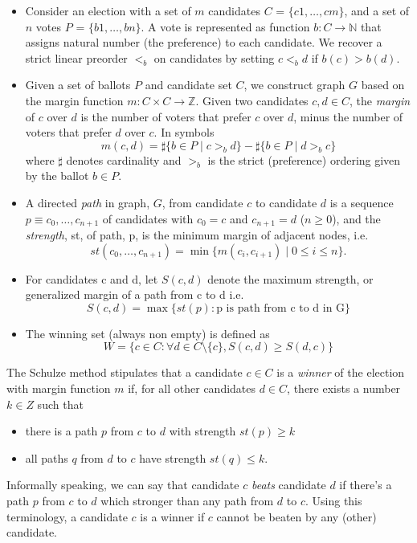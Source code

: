 \begin{itemize}

\item Consider an election with a set of $m$ candidates
 $C$ = $\{c1,\dots,cm\}$, and 
	a set of $n$ votes $P$ = $\{b1,\dots,bn\}$. A vote
	is represented as function $b: C \rightarrow \mathbb{N}$ that 
	assigns natural 
	number (the preference) to each candidate. We recover a strict linear  
	preorder $<_b$ on candidates by setting $c <_b d$ if $b(c) > b(d)$. 
	
\item Given a set of ballots $P$ and candidate set $C$, we construct graph $G$ based on the margin function $m: C \times C \to \mathbb{Z}$. Given two candidates $c, d \in C$,
the \emph{margin} of $c$ over $d$ is
the number of voters that prefer $c$ over $d$, minus the number of voters that prefer $d$ over $c$. In symbols
\[
  m(c, d) = \sharp \lbrace b \in P \mid c >_b d \rbrace -
            \sharp \lbrace b \in P \mid d >_b c \rbrace
\] where $\sharp$ denotes cardinality and $>_b$ is the strict
(preference) ordering given by the ballot $b \in P$.





\item A directed \emph{path} in graph, $G$, from
candidate $c$ to candidate $d$ is a sequence $p \equiv c_0, \dots, c_{n+1}$
of candidates with $c_0 = c$ and $c_{n+1} = d$ ($n \geq 0$), and the
\emph{strength}, st, of path, p, is the minimum margin of adjacent
nodes, i.e.
\[ st(c_0, \dots, c_{n+1}) = \min \lbrace m (c_i, c_{i+1}) \mid 0
\leq i \leq n \rbrace. \]
\item For candidates c and d, let $S(c, d)$ denote the maximum strength, or generalized margin of a path
	from c to d i.e. 
	\[ S(c, d) = \max \lbrace st (p) : \text{p is path from c to d in G} \rbrace\]
	
\item The winning set (always non empty) is defined as 
 \[ W =  \lbrace c \in C : \forall d \in C \setminus \{c\}, S (c, d) \geq S (d, c) \rbrace\]

\end{itemize}

The Schulze method
stipulates that a candidate $c \in C$ is a \emph{winner} of the
election with margin function $m$ if, for all other candidates $d \in
C$, there exists a number $k \in Z$ such that
\begin{itemize}
\item there is a path $p$ from $c$ to $d$ with strength $st(p) \geq k$
\item all paths $q$ from $d$ to $c$ have strength $st(q) \leq k$.
\end{itemize}
Informally speaking, we can say that  candidate $c$
\emph{beats} candidate $d$ if there's a path $p$ from
$c$ to $d$ which stronger than any path from $d$ to $c$. Using
this terminology, a candidate $c$ is a winner if $c$ cannot be
beaten by any (other) candidate.


